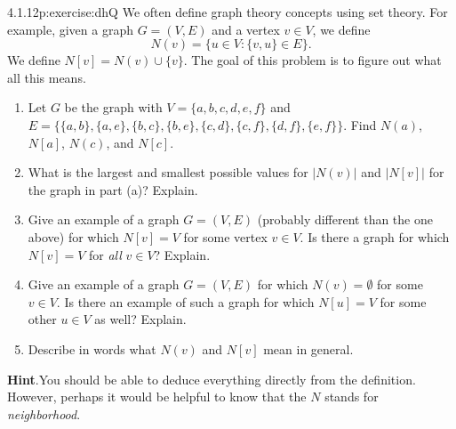 \documentclass[twoside,11pt,]{book}
\newcommand{\blocktitlefont}{\relax}
\numberwithin{equation}{chapter}
\newcommand{\st}{:}
\begin{document}
\begin{divisionsolution}{4.1.12}{}{p:exercise:dhQ}%
We often define graph theory concepts using set theory.  For example, given a graph \(G = (V, E)\) and a vertex \(v \in V\), we define%
\begin{equation*}
N(v) = \{u \in V \st \{v,u\} \in E\}\text{.}
\end{equation*}
We define \(N[v] = N(v) \cup \{v\}\).  The goal of this problem is to figure out what all this means.%
\begin{enumerate}[label=(\alph*)]
\item{}Let \(G\) be the graph with \(V = \{a,b,c,d,e,f\}\) and \(E = \{\{a,b\}, \{a,e\},\{b, c\}, \{b,e\}, \{c,d\}, \{c, f\}, \{d, f\}, \{e,f\}\}\).  Find \(N(a)\), \(N[a]\), \(N(c)\), and \(N[c]\).%
\item{}What is the largest and smallest possible values for \(|N(v)|\) and \(|N[v]|\) for the graph in part (a)?  Explain.%
\item{}Give an example of a graph \(G = (V, E)\) (probably different than the one above) for which \(N[v] = V\) for some vertex \(v \in V\).  Is there a graph for which \(N[v] = V\) for \emph{all} \(v \in V\)?  Explain.%
\item{}Give an example of a graph \(G = (V,E)\) for which \(N(v) = \emptyset\) for some \(v \in V\).  Is there an example of such a graph for which \(N[u] = V\) for some other \(u \in V\) as well?  Explain.%
\item{}Describe in words what \(N(v)\) and \(N[v]\) mean in general.%
\end{enumerate}
%
\par\smallskip%
\noindent\textbf{\blocktitlefont Hint}.\quad{}You should be able to deduce everything directly from the definition.  However, perhaps it would be helpful to know that the \(N\) stands for \emph{neighborhood}.%
\end{divisionsolution}%
\end{document}
